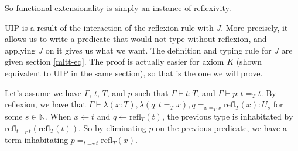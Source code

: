 So functional extensionality is simply an instance of reflexivity.

UIP is a result of the interaction of the reflexion rule with $J$. More
precisely, it allows us to write a predicate that would not type without
reflexion, and applying $J$ on it gives us what we want. The definition and
typing rule for $J$ are given section \ref{mltt-eq}. The proof is actually
easier for axiom $K$ (shown equivalent to UIP in the same section), so that is
the one we will prove.

Let's assume we have $\Gamma$, $t$, $T$, and $p$ such that $\Gamma\vdash t:T$,
and $\Gamma\vdash p : t =_T t$. By reflexion, we have that $\Gamma\vdash
\lambda(x:T),\lambda(q : t =_T x), q =_{x =_T x} \text{refl}_T(x) : U_s$ for
some $s\in\mathbb{N}$. When $x \leftarrow t$ and $q \leftarrow
\text{refl}_T(t)$, the previous type is inhabitated by $\text{refl}_{t=_T
t}(\text{refl}_T(t))$. So by eliminating $p$ on the previous predicate, we have
a term inhabitating $p =_{t =_T t} \text{refl}_T(x)$.

